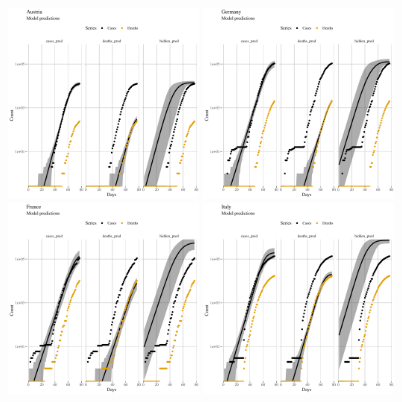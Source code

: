 \documentclass[a4paper]{tufte-handout}
\begin{document}
\begin{figure}
  \begin{center}
    \includegraphics[width=0.45\textwidth]{figs/model_pred_AUT.pdf}
    \includegraphics[width=0.45\textwidth]{figs/model_pred_DEU.pdf}
    \includegraphics[width=0.45\textwidth]{figs/model_pred_FRA.pdf}
    \includegraphics[width=0.45\textwidth]{figs/model_pred_ITA.pdf}

\end{center}
\end{figure}
\end{document}
